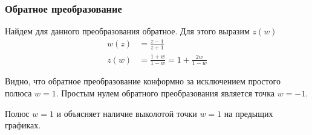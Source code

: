 \begin{frame}\frametitle{Обратное преобразование}
	Найдем для данного преобразования обратное.
	Для этого выразим \(z(w)\)
	\begin{align*}
		w(z) & = \frac{z-1}{z+1}                      \\
		z(w) & = \frac{1+w}{1-w} = 1 + \frac{2w}{1-w}
	\end{align*}

	Видно, что обратное преобразование конформно за исключением
	простого полюса \(w = 1\).
	Простым нулем обратного преобразования является точка \(w = -1\).

  Полюс \(w = 1\) и объясняет наличие выколотой точки \(w = 1\) 
  на предыщих графиках.
\end{frame}
